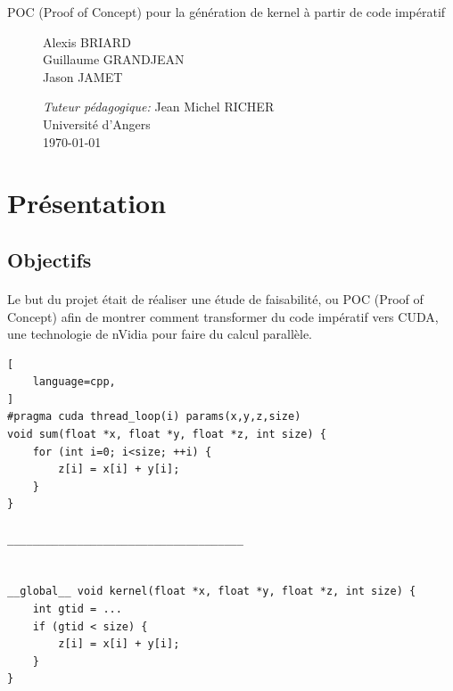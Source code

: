 \documentclass{article}
\begin{document}
\begin{titlepage}
\begin{center}
\begin{Huge}
			\end{Huge}
			\begin{Large}
				POC (Proof of Concept) pour la génération de kernel à partir de code impératif
			\end{Large}		
			 
		\end{center}
		
		
  		\begin{figure}[b]
  		 \begin{minipage}{0.4\textwidth}
			\begin{flushleft} \large
				Alexis BRIARD\\
				Guillaume GRANDJEAN\\
				Jason JAMET
    		\end{flushleft}
    		\end{minipage}
    		\begin{minipage}{0.6\textwidth}
			\begin{flushright} \large
				\emph{Tuteur pédagogique:} Jean Michel RICHER\\				
        		Université d'Angers\\
        		\today
    		\end{flushright}
    	\end{minipage}
		\end{figure}

    	
	\end{titlepage}



\newpage
\thispagestyle{empty}
\mbox{}
\setcounter{page}{0}
\glsresetall
\newpage
\tableofcontents
\newpage

	\section{Présentation}

	\subsection{Objectifs}

	\paragraph{}
	Le but du projet était de réaliser une étude de faisabilité, ou POC (Proof of Concept) afin de montrer comment transformer du code impératif vers CUDA, une technologie de nVidia pour faire du calcul parallèle.
	
	\begin{lstlisting}[
    language=cpp,
]
#pragma cuda thread_loop(i) params(x,y,z,size) 
void sum(float *x, float *y, float *z, int size) { 
	for (int i=0; i<size; ++i) {
		z[i] = x[i] + y[i];
	}
}

_____________________________________


__global__ void kernel(float *x, float *y, float *z, int size) { 
	int gtid = ...
	if (gtid < size) {
		z[i] = x[i] + y[i];
	}
}
	
	\end{lstlisting}	
	
\end{document}
